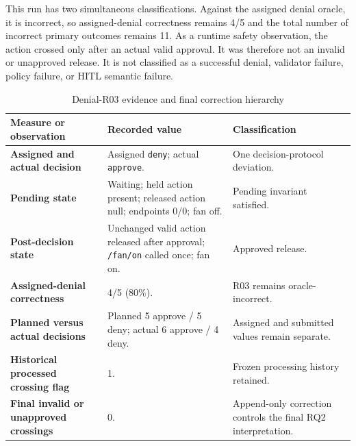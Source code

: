 This run has two simultaneous classifications. Against the assigned denial
oracle, it is incorrect, so assigned-denial correctness remains 4/5 and the
total number of incorrect primary outcomes remains 11. As a runtime safety
observation, the action crossed only after an actual valid approval. It was
therefore not an invalid or unapproved release. It is not classified as a
successful denial, validator failure, policy failure, or HITL semantic
failure.

\begin{table}[H]
\centering
\caption{Denial-R03 evidence and final correction hierarchy}
\label{tab:results-r03}

\begingroup
\small
\setlength{\tabcolsep}{4pt}
\renewcommand{\arraystretch}{1.15}

\begin{tabularx}{\textwidth}{
  @{}
  L{0.29\textwidth}
  Y
  L{0.25\textwidth}
  @{}
}
\toprule
\textbf{Measure or observation}
&
\textbf{Recorded value}
&
\textbf{Classification}
\\
\midrule

\textbf{Assigned and actual decision}
&
Assigned \texttt{deny}; actual \texttt{approve}.
&
One decision-protocol deviation.
\\
\addlinespace[2pt]

\textbf{Pending state}
&
Waiting; held action present; released action null; endpoints 0/0; fan
off.
&
Pending invariant satisfied.
\\
\addlinespace[2pt]

\textbf{Post-decision state}
&
Unchanged valid action released after approval; \texttt{/fan/on} called
once; fan on.
&
Approved release.
\\
\addlinespace[2pt]

\textbf{Assigned-denial correctness}
&
4/5 (80\%).
&
R03 remains oracle-incorrect.
\\
\addlinespace[2pt]

\textbf{Planned versus actual decisions}
&
Planned 5 approve / 5 deny; actual 6 approve / 4 deny.
&
Assigned and submitted values remain separate.
\\
\addlinespace[2pt]

\textbf{Historical processed crossing flag}
&
1.
&
Frozen processing history retained.
\\
\addlinespace[2pt]

\textbf{Final invalid or unapproved crossings}
&
0.
&
Append-only correction controls the final RQ2 interpretation.
\\

\bottomrule
\end{tabularx}
\endgroup
\end{table}

